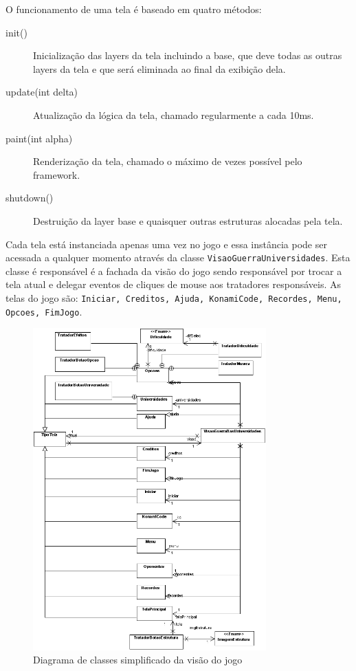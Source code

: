 \documentclass[brazil,times]{abnt}
\begin{document}
O funcionamento de uma tela é baseado em quatro métodos:
\begin{description}
  \item[init()] Inicialização das layers da tela incluindo a base, que deve todas as
outras layers da tela e que será eliminada ao final da exibição dela.
  \item[update(int delta)] Atualização da lógica da tela, chamado regularmente
a cada 10ms.
  \item[paint(int alpha)] Renderização da tela, chamado o máximo
de vezes possível pelo framework.
  \item[shutdown()] Destruição da layer base e quaisquer outras estruturas
  alocadas pela tela.
\end{description}

Cada tela está instanciada apenas uma vez no jogo e essa instância pode ser
acessada a qualquer momento através da classe \texttt{VisaoGuerraUniversidades}.
Esta classe é responsável é a fachada da visão do jogo sendo responsável por
trocar a tela atual e delegar eventos de cliques de mouse aos tratadores
responsáveis. As telas do jogo são: \texttt{Iniciar, Creditos, Ajuda,
KonamiCode, Recordes, Menu, Opcoes, FimJogo}.


\begin{figure}[htp]
\begin{center}
  \includegraphics[width=0.8\textwidth]{imagens/VisaoSimples.png}
  \caption[Diagrama de classes simplificado da visão do jogo]{Diagrama de
  classes simplificado da visão do jogo}
  \label{modelo-simples}
\end{center}
\end{figure}
\end{document}
